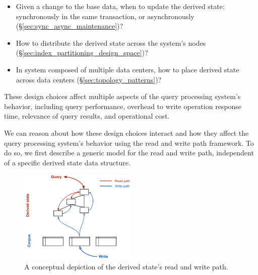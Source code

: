 \begin{itemize}

  \item Given a change to the base data, when to update the derived state:
  synchronously in the same transaction, or asynchronously (\S\ref{sec:sync_async_maintenance})?

  \item How to distribute the derived state across the system's nodes (\S\ref{sec:index_partitioning_design_space})?

  \item In system composed of multiple data centers,
  how to place derived state across data centers (\S\ref{sec:topology_patterns})?


\end{itemize}

These design choices affect multiple aspects of the query processing system's behavior,
including query performance, overhead to write operation response time, relevance of query results, and operational cost.

We can reason about how these design choices interact and how they affect the query processing system's behavior
using the read and write path framework.
To do so, we first describe a generic model for the read and write path,
independent of a specific derived state data structure.

\begin{figure}[H]
  \centering
    \includegraphics[width=0.5\textwidth]{./figures/design_space/read_write_path.pdf}
  \caption{A conceptual depiction of the derived state's read and write path.}
  \label{fig:design_space_read_write_path}
\end{figure}

